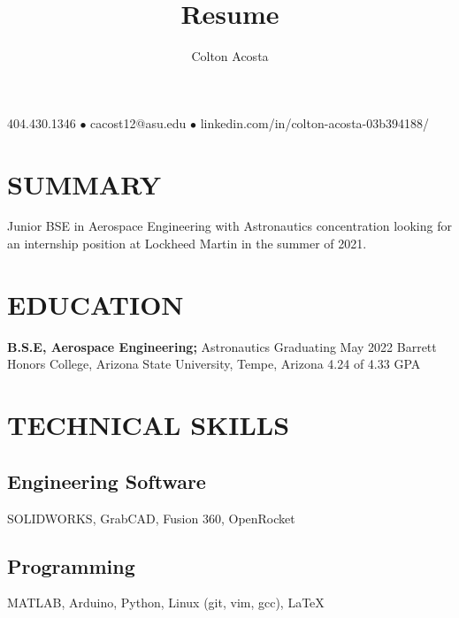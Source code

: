 \documentclass{article}
\makeatletter
\renewcommand{\maketitle}{
	\begin{center}
		{\huge\bfseries
			\theauthor}
			
		404.430.1346 $\bullet$ cacost12@asu.edu $\bullet$ linkedin.com/in/colton-acosta-03b394188/
	\end{center}
}
\makeatother
\begin{document}
\title{Resume}
\author{Colton Acosta}
\maketitle
\section{SUMMARY}
Junior BSE in Aerospace Engineering with Astronautics concentration looking for an internship position at Lockheed Martin in the summer of 2021.
\section{EDUCATION}
\textbf{B.S.E, Aerospace Engineering;} Astronautics
\hfill 
Graduating May 2022
\linebreak
Barrett Honors College, Arizona State University, Tempe, Arizona 
\hfill
4.24 of 4.33 GPA
\section{TECHNICAL SKILLS}
\subsection{Engineering Software}
SOLIDWORKS, GrabCAD, Fusion 360, OpenRocket 
\subsection{Programming} 
MATLAB, Arduino, Python, Linux (git, vim, gcc), {\LaTeX}
\end{document}
